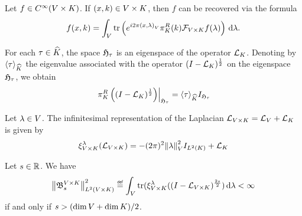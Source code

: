 \begin{proposition}
    Let $f \in \SmoothFunctions \GroupDirect$.
    If $(x, k) \in \GroupDirect$,
    then $f$ can be recovered via the formula
    \begin{align*}
        f(x, k) = \int_\VectorSpace \tr\left(\e^{\i \turn \ip x \lambda} \RightRegularRepresentation(k) \Fourier[\GroupDirect] f(\lambda) \right) \dd \lambda.
    \end{align*}
\end{proposition}

\begin{lemma}
    For each $\tau \in \dualGroup\CompactGroup$,
    the space $\HilbertCompactGroup{\tau}$ is an eigenspace of the operator $\Laplacian[\CompactGroup]$.
    Denoting by $\JapaneseBracket{\CompactGroup}{\tau}$ the eigenvalue associated with the operator $\BesselPotential[\CompactGroup]{1}$ on the eigenspace $\HilbertCompactGroup\tau$, we obtain
    \begin{align*}
        \eval{\RightRegularRepresentation\left(\BesselPotential[\CompactGroup]{1}\right)}{\HilbertCompactGroup\tau}
        = \JapaneseBracket{\CompactGroup}{\tau} \Id{\HilbertCompactGroup\tau}
    \end{align*}
\end{lemma}

\begin{lemma}
    Let $\lambda \in \VectorSpace$.
    The infinitesimal representation of the Laplacian $\Laplacian [\GroupDirect] = \Laplacian [\VectorSpace] + \Laplacian [\CompactGroup]$
    is given by
    \begin{align*}
        \Rep [\GroupDirect] \lambda (\Laplacian [\GroupDirect])
        = - (\turn)^2 \norm \lambda^2 \Id{\Lebesgue 2 \CompactGroup} + \Laplacian [\CompactGroup]
    \end{align*}
\end{lemma}

\begin{proposition}
    Let $s \in \R$.
    We have
    \begin{align*}
        \norm [\Lebesgue 2 \GroupDirect] {\BesselPotentialKernel [\GroupDirect] {s}}^2
        \defeq \int_\VectorSpace \tr(\Rep [\GroupDirect] \lambda (\BesselPotential [\GroupDirect] {2s}) \dd \lambda < \infty
    \end{align*}
    if and only if $s > (\dim \VectorSpace + \dim \CompactGroup) / 2$.
\end{proposition}

